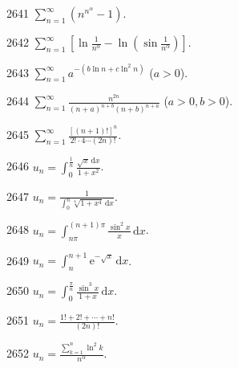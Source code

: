 \begin{prob}[S]{2641}
$\sum_{n=1}^{\infty} (n^{n^{\alpha}} - 1)$.
\end{prob}

\begin{prob}[S]{2642}
$\sum_{n=1}^{\infty} \left[\ln \frac{1}{n^{\alpha}} - \ln \left(\sin \frac{1}{n^{\alpha}}\right)\right]$.
\end{prob}

\begin{prob}[S]{2643}
$\sum_{n=1}^{\infty} a^{-(b\ln n + c\ln^2 n)}$ ($a > 0$).
\end{prob}

\begin{prob}[S]{2644}
$\sum_{n=1}^{\infty} \frac{n^{2n}}{(n+a)^{n+b}(n+b)^{n+a}}$ ($a > 0, b > 0$).
\end{prob}

\begin{prob}[S]{2645}
$\sum_{n=1}^{\infty} \frac{[(n+1)!]^n}{2! \cdot 4 \cdots (2n)!}$.
\end{prob}


\begin{prob}[S]{2646}
$u_n = \int_0^{\frac{1}{n}} \frac{\sqrt{x}\,\mathrm{d}x}{1 + x^2}$.
\end{prob}

\begin{prob}[S]{2647}
$u_n = \frac{1}{\int_0^n \sqrt[4]{1 + x^4}\,\mathrm{d}x}$.
\end{prob}

\begin{prob}[S]{2648}
$u_n = \int_{n\pi}^{(n+1)\pi} \frac{\sin^2 x}{x}\,\mathrm{d}x$.
\end{prob}

\begin{prob}[S]{2649}
$u_n = \int_n^{n+1} \mathrm{e}^{-\sqrt{x}}\,\mathrm{d}x$.
\end{prob}

\begin{prob}[S]{2650}
$u_n = \int_0^{\frac{\pi}{n}} \frac{\sin^3 x}{1 + x}\,\mathrm{d}x$.
\end{prob}

\begin{prob}[S]{2651}
$u_n = \frac{1! + 2! + \cdots + n!}{(2n)!}$.
\end{prob}

\begin{prob}[S]{2652}
$u_n = \frac{\sum_{k=1}^n \ln^2 k}{n^{\alpha}}$.
\end{prob}

